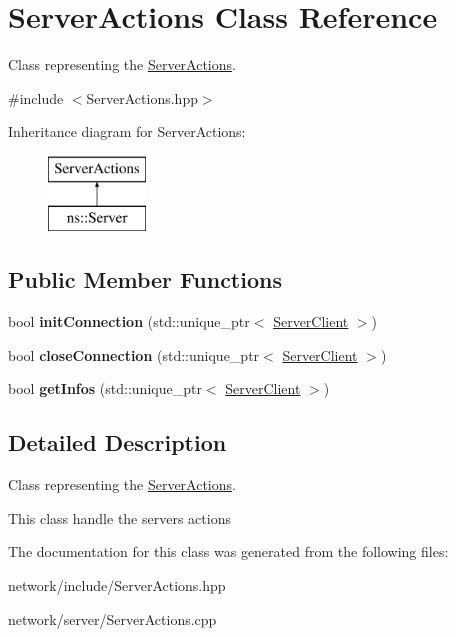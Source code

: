 \hypertarget{class_server_actions}{}\section{Server\+Actions Class Reference}
\label{class_server_actions}


Class representing the \hyperlink{class_server_actions}{Server\+Actions}.  




{\ttfamily \#include $<$Server\+Actions.\+hpp$>$}

Inheritance diagram for Server\+Actions\+:\begin{figure}[H]
\begin{center}
\leavevmode
\includegraphics[height=2.000000cm]{class_server_actions}
\end{center}
\end{figure}
\subsection*{Public Member Functions}
\begin{DoxyCompactItemize}
\item 
\mbox{\label{class_server_actions_af37fa5e3c48b269ea5c020b398a9791f}} 
bool {\bfseries init\+Connection} (std\+::unique\+\_\+ptr$<$ \hyperlink{class_server_client}{Server\+Client} $>$)
\item 
\mbox{\label{class_server_actions_a84b54c31a9b2c36b71e60d96c4551691}} 
bool {\bfseries close\+Connection} (std\+::unique\+\_\+ptr$<$ \hyperlink{class_server_client}{Server\+Client} $>$)
\item 
\mbox{\label{class_server_actions_a5010277a6ba0dcab261f6a506990a234}} 
bool {\bfseries get\+Infos} (std\+::unique\+\_\+ptr$<$ \hyperlink{class_server_client}{Server\+Client} $>$)
\end{DoxyCompactItemize}


\subsection{Detailed Description}
Class representing the \hyperlink{class_server_actions}{Server\+Actions}. 

This class handle the server\textquotesingle{}s actions 

The documentation for this class was generated from the following files\+:\begin{DoxyCompactItemize}
\item 
network/include/Server\+Actions.\+hpp\item 
network/server/Server\+Actions.\+cpp\end{DoxyCompactItemize}
